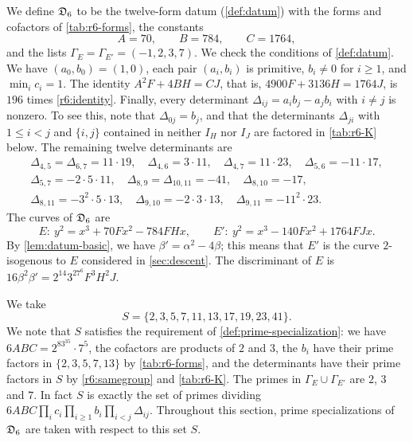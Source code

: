 We define $\mathfrak D_6$ to be the twelve-form datum (\cref{def:datum}) with the forms and cofactors of \cref{tab:r6-forms}, the constants
\[
A=70,\qquad B=784,\qquad C=1764,
\]
and the lists $\Gamma_E=\Gamma_{E'}=(-1,2,3,7)$. We check the conditions of \cref{def:datum}. We have $(a_0,b_0)=(1,0)$, each pair $(a_i,b_i)$ is primitive, $b_i\ne0$ for $i\ge1$, and $\min_ic_i=1$. The identity $A^2F+4BH=CJ$, that is, $4900F+3136H=1764J$, is $196$ times \eqref{r6:identity}. Finally, every determinant $\Delta_{ij}=a_ib_j-a_jb_i$ with $i\ne j$ is nonzero. To see this, note that $\Delta_{0j}=b_j$, and that the determinants $\Delta_{ji}$ with $1\le i<j$ and $\{i,j\}$ contained in neither $I_H$ nor $I_J$ are factored in \cref{tab:r6-K} below. The remaining twelve determinants are
\begin{equation}\label{r6:samegroup}
\begin{gathered}
\Delta_{4,5}=\Delta_{6,7}=11\cdot19,\quad \Delta_{4,6}=3\cdot11,\quad \Delta_{4,7}=11\cdot23,\quad \Delta_{5,6}=-11\cdot17,\\
\Delta_{5,7}=-2\cdot5\cdot11,\quad \Delta_{8,9}=\Delta_{10,11}=-41,\quad \Delta_{8,10}=-17,\\
\Delta_{8,11}=-3^{2}\cdot5\cdot13,\quad \Delta_{9,10}=-2\cdot3\cdot13,\quad \Delta_{9,11}=-11^{2}\cdot23.
\end{gathered}
\end{equation}
The curves of $\mathfrak D_6$ are
\begin{equation}\label{r6:curves}
E:\ y^2=x^3+70Fx^2-784FHx,\qquad E':\ y^2=x^3-140Fx^2+1764FJx.
\end{equation}
By \cref{lem:datum-basic}, we have $\beta'=\alpha^2-4\beta$; this means that $E'$ is the curve $2$-isogenous to $E$ considered in \cref{sec:descent}. The discriminant of $E$ is $16\beta^2\beta'=2^{14}3^27^6F^3H^2J$.

We take
\begin{equation}\label{r6:S}
S=\{2,3,5,7,11,13,17,19,23,41\}.
\end{equation}
We note that $S$ satisfies the requirement of \cref{def:prime-specialization}: we have $6ABC=2^83^35\cdot7^5$, the cofactors are products of $2$ and $3$, the $b_i$ have their prime factors in $\{2,3,5,7,13\}$ by \cref{tab:r6-forms}, and the determinants have their prime factors in $S$ by \eqref{r6:samegroup} and \cref{tab:r6-K}. The primes in $\Gamma_E\cup\Gamma_{E'}$ are $2$, $3$ and $7$. In fact $S$ is exactly the set of primes dividing $6ABC\prod_ic_i\prod_{i\ge1}b_i\prod_{i<j}\Delta_{ij}$. Throughout this section, prime specializations of $\mathfrak D_6$ are taken with respect to this set $S$.


